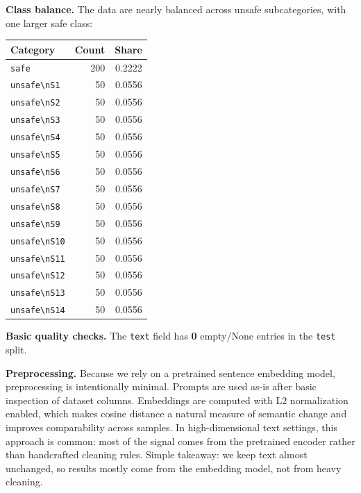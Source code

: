 \documentclass[11pt,a4paper]{article}
\begin{document}
\textbf{Class balance.} The data are nearly balanced across unsafe subcategories, with one larger safe class:
\begin{center}
\begin{tabular}{lrr}
\toprule
Category & Count & Share \\
\midrule
\texttt{safe} & 200 & 0.2222 \\
\texttt{unsafe\textbackslash nS1}  & 50 & 0.0556 \\
\texttt{unsafe\textbackslash nS2}  & 50 & 0.0556 \\
\texttt{unsafe\textbackslash nS3}  & 50 & 0.0556 \\
\texttt{unsafe\textbackslash nS4}  & 50 & 0.0556 \\
\texttt{unsafe\textbackslash nS5}  & 50 & 0.0556 \\
\texttt{unsafe\textbackslash nS6}  & 50 & 0.0556 \\
\texttt{unsafe\textbackslash nS7}  & 50 & 0.0556 \\
\texttt{unsafe\textbackslash nS8}  & 50 & 0.0556 \\
\texttt{unsafe\textbackslash nS9}  & 50 & 0.0556 \\
\texttt{unsafe\textbackslash nS10} & 50 & 0.0556 \\
\texttt{unsafe\textbackslash nS11} & 50 & 0.0556 \\
\texttt{unsafe\textbackslash nS12} & 50 & 0.0556 \\
\texttt{unsafe\textbackslash nS13} & 50 & 0.0556 \\
\texttt{unsafe\textbackslash nS14} & 50 & 0.0556 \\
\bottomrule
\end{tabular}
\end{center}

\textbf{Basic quality checks.} The \texttt{text} field has \textbf{0} empty/None entries in the \texttt{test} split.

\textbf{Preprocessing.} Because we rely on a pretrained sentence embedding model, preprocessing is intentionally minimal. Prompts are used as-is after basic inspection of dataset columns. Embeddings are computed with L2 normalization enabled, which makes cosine distance a natural measure of semantic change and improves comparability across samples. In high-dimensional text settings, this approach is common: most of the signal comes from the pretrained encoder rather than handcrafted cleaning rules.
\newline Simple takeaway: we keep text almost unchanged, so results mostly come from the embedding model, not from heavy cleaning.
\end{document}
